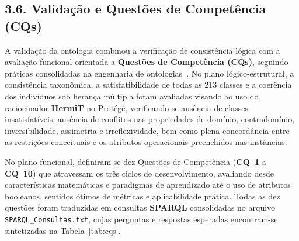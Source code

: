 \documentclass[11pt,a4paper]{article}
\begin{document}
\subsection{3.6. Validação e Questões de Competência (CQs)}

A validação da ontologia combinou a verificação de consistência lógica com a avaliação funcional orientada a \textbf{Questões de Competência (CQs)}, seguindo práticas consolidadas na engenharia de ontologias~\cite{bezerra2013evaluating,potoniec2020dataset}. No plano lógico-estrutural, a consistência taxonômica, a satisfatibilidade de todas as 213 classes e a coerência dos indivíduos sob herança múltipla foram avaliadas visando ao uso do raciocinador \textbf{HermiT} no Protégé, verificando-se ausência de classes insatisfatíveis, ausência de conflitos nas propriedades de domínio, contradomínio, inversibilidade, assimetria e irreflexividade, bem como plena concordância entre as restrições conceituais e os atributos operacionais preenchidos nas instâncias.

No plano funcional, definiram-se dez Questões de Competência (\textbf{CQ~1} a \textbf{CQ~10}) que atravessam os três ciclos de desenvolvimento, avaliando desde características matemáticas e paradigmas de aprendizado até o uso de atributos booleanos, sentidos ótimos de métricas e aplicabilidade prática. Todas as dez questões foram traduzidas em consultas \textbf{SPARQL} consolidadas no arquivo \texttt{SPARQL\_Consultas.txt}, cujas perguntas e respostas esperadas encontram-se sintetizadas na Tabela~\ref{tab:cqs}.
\end{document}
